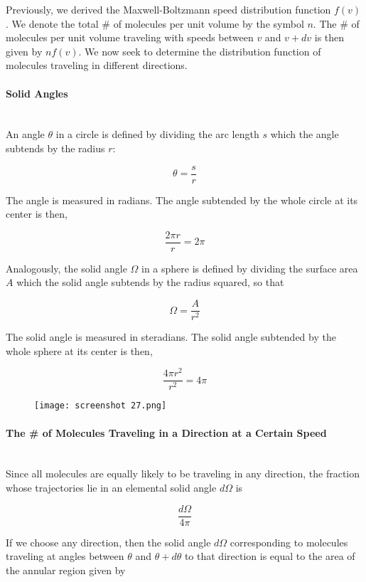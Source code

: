 \documentclass[svgnames]{article}     %
\begin{document}
Previously, we derived the Maxwell-Boltzmann speed distribution function
$f(v)$. We denote the total \# of molecules per unit volume by the symbol $n$.
The \# of molecules per unit volume traveling with speeds between $v$ and $v
+ dv$ is then given by $nf(v)$. We now seek to determine the distribution
function of molecules traveling in different directions. 

\paragraph{Solid Angles} \mbox{}\\ 

An angle $\theta$ in a circle is defined by dividing the arc length $s$ which
the angle subtends by the radius $r$: 

\[
\theta = \frac{s}{r}
\] 

The angle is measured in radians. The angle subtended by the whole circle at
its center is then, 

\[
\frac{2\pi r}{r} = 2\pi
\] 

Analogously, the solid angle $\Omega$ in a sphere is defined by dividing the
surface area $A$ which the solid angle subtends by the radius squared, so that 

\[
\Omega = \frac{A}{r^2}
\] 

The solid angle is measured in steradians. The solid angle subtended by the
whole sphere at its center is then, 

\[
\frac{4\pi r^2}{r^2} = 4\pi
\] 

\begin{figure}[H]
  \centering
    \texttt{[image: screenshot 27.png]}
\end{figure}

\paragraph{The \# of Molecules Traveling in a Direction at a Certain
Speed} \mbox{} \\

Since all molecules are equally likely to be traveling in any direction, the
fraction whose trajectories lie in an elemental solid angle $d\Omega$ is 

\[
\frac{d \Omega}{4\pi} 
\] \vspace{5px}

If we choose any direction, then the solid angle $d\Omega$ corresponding to
molecules traveling at angles between $\theta$ and $\theta + d\theta$ to that
direction is equal to the area of the annular region given by 
\end{document}
